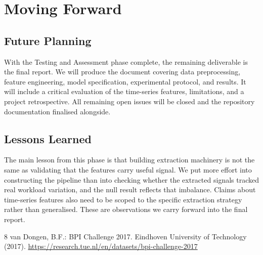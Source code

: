 \documentclass[runningheads]{llncs}
\begin{document}
\section{Moving Forward}

\subsection{Future Planning}
With the Testing and Assessment phase complete, the remaining deliverable is the final
report. We will produce the document covering data preprocessing, feature
engineering, model specification, experimental protocol, and results. It will include a
critical evaluation of the time-series features, limitations, and a project retrospective.
All remaining open issues will be closed and the repository documentation finalised
alongside.

\subsection{Lessons Learned}
The main lesson from this phase is that building extraction machinery is not the same as
validating that the features carry useful signal. We put more effort into constructing the
pipeline than into checking whether the extracted signals tracked real workload variation,
and the null result reflects that imbalance. Claims about time-series features also need
to be scoped to the specific extraction strategy rather than generalised. These are
observations we carry forward into the final report.

\begin{thebibliography}{8}
    van Dongen, B.F.: BPI Challenge 2017. Eindhoven University of Technology (2017). \url{https://research.tue.nl/en/datasets/bpi-challenge-2017}
\end{thebibliography}
\end{document}
